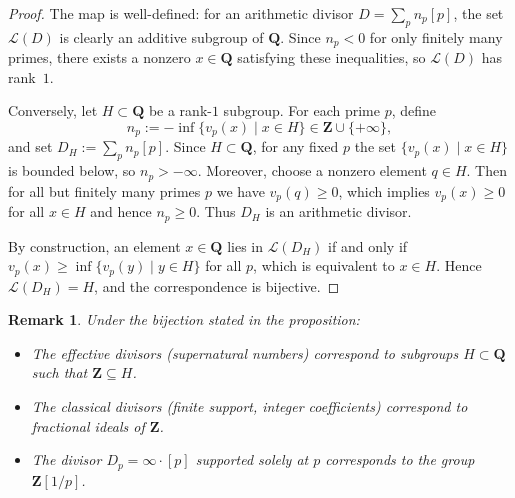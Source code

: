 \documentclass[11pt,a4paper]{article}
\newcommand{\Q}{\mathbf{Q}}
\newcommand{\Z}{\mathbf{Z}}
\theoremstyle{plain}
\newtheorem{rem}[thm]{Remark}
\theoremstyle{definition} %
\begin{document}
\begin{proof}
    The map is well-defined: for an arithmetic divisor
$D=\sum_p n_p[p]$, the set $\mathcal L(D)$
is clearly an additive subgroup of $\Q$. Since $n_p<0$ for only finitely many primes,
there exists a nonzero $x\in\Q$ satisfying these inequalities, so $\mathcal L(D)$ has
rank~$1$.

Conversely, let $H\subset\Q$ be a rank-$1$ subgroup. For each prime $p$, define
\[
n_p:=-\inf\{v_p(x)\mid x\in H\}\in\Z\cup\{+\infty\},
\]
and set $D_H:=\sum_p n_p[p]$.
Since $H\subset\Q$, for any fixed $p$ the set $\{v_p(x)\mid x\in H\}$ is bounded below,
so $n_p>-\infty$.
Moreover, choose a nonzero element $q\in H$.
Then for all but finitely many primes $p$ we have $v_p(q)\ge 0$, which implies
$v_p(x)\ge 0$ for all $x\in H$ and hence $n_p\ge 0$.
Thus $D_H$ is an arithmetic divisor.

By construction, an element $x\in\Q$ lies in $\mathcal L(D_H)$ if and only if
$v_p(x)\ge \inf\{v_p(y)\mid y\in H\}$ for all $p$, which is equivalent to $x\in H$.
Hence $\mathcal L(D_H)=H$, and the correspondence is bijective.
\end{proof}

\begin{rem}
Under the bijection stated in the proposition:
\begin{itemize}[leftmargin=*, labelindent=0pt]
    \item[-] The effective divisors (supernatural numbers) correspond to subgroups $H\subset\Q$ such that $\Z \subseteq H$.
    \item[-] The classical divisors (finite support, integer coefficients) correspond to fractional ideals of $\Z$.
    \item[-] The divisor $D_p = \infty \cdot [p]$ supported solely at $p$ corresponds to the group $\Z[1/p]$.
\end{itemize}
\end{rem}
\end{document}

